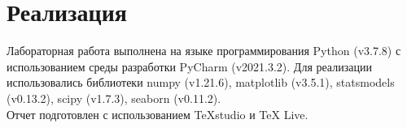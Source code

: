\section{Реализация}
\begin{flushleft}
	Лабораторная работа выполнена на языке программирования Python (v3.7.8) с использованием среды разработки PyCharm (v2021.3.2).
	Для реализации использовались библиотеки numpy (v1.21.6), matplotlib (v3.5.1), statsmodels (v0.13.2), scipy (v1.7.3), seaborn (v0.11.2). \\
	Отчет подготовлен с использованием TeXstudio и TeX Live.
\end{flushleft}